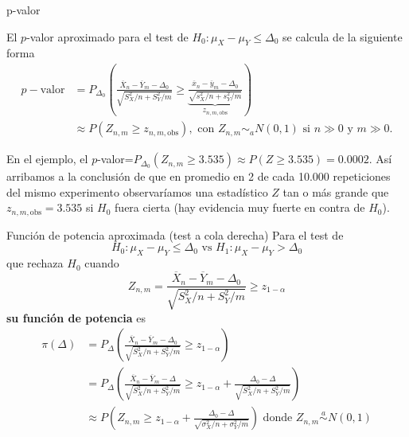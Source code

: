 \documentclass{beamer}
\theoremstyle{definition}
\begin{document}
\begin{frame}{\color{rosee} p-valor}
    
El $p$-valor aproximado para el test de $H_0: \mu_X-\mu_Y \leq \Delta_0$ se calcula de la siguiente forma
$$
\begin{aligned}
p-\text {valor} &=P_{\Delta_0}\left(\frac{\overline{X}_{n}-\overline{Y}_{m}-\Delta_0}{\sqrt{S_X^2 / n+S_Y^2 / m}} \geq \underbrace{\frac{\overline{x}_{n}-\overline{y}_{m}-\Delta_0}{\sqrt{s_X^2 / n+s_Y^2 / m}}}_{z_{n,m,\text{obs}}}\right) \\
&\approx P\left(Z_{n,m} \geq z_{n,m,\text{obs}}\right), \text{ con } Z_{n,m}\sim_a N(0,1) \text{ si } n\gg0 \text{ y } m\gg0.
\end{aligned}
$$

En el ejemplo, el $p$-valor=$P_{\Delta_0}(Z_{n,m}\geq 3.535)\approx P(Z\geq 3.535)=0.0002$.
 As\'i arribamos a la conclusi\'on de que en promedio en 2 de cada 10.000 repeticiones del mismo experimento observar\'iamos una estad\'istico $Z$ tan o m\'as grande que $z_{n,m,\text{obs}} = 3.535$ si $H_0$ fuera cierta (hay evidencia muy fuerte en contra de $H_0$).
\end{frame}




\begin{frame}{\color{rosee} Funci\'on de potencia aproximada (test a cola derecha)}
    \small
Para el test de
$$
H_0: \mu_X-\mu_Y \leq \Delta_0 \text { vs } H_1: \mu_X-\mu_Y>\Delta_0
$$
que rechaza $H_0$ cuando
$$
Z_{n,m}=\frac{\overline{X}_{n}-\overline{Y}_{m}-\Delta_0}{\sqrt{S_X^2 / n+S_Y^2 / m}} \geq z_{1-\alpha}
$$
\textbf{su funci\'on de potencia} es
$$
\begin{aligned}
\pi(\Delta) &=P_{\Delta}\left(\frac{\overline{X}_{n}-\overline{Y}_{m}-\Delta_0}{\sqrt{S_X^2 / n+S_Y^2 / m}} \geq z_{1-\alpha}\right) \\
&=P_{\Delta}\left(\frac{\overline{X}_{n}-\overline{Y}_{m}-\Delta}{\sqrt{S_X^2 / n+S_Y^2 / m}} \geq z_{1-\alpha}+\frac{\Delta_0-\Delta}{\sqrt{S_X^2 / n+S_Y^2 / m}}\right) \\
& \approx P\left(Z_{n,m} \geq z_{1- \alpha}+\frac{\Delta_0-\Delta}{\sqrt{\sigma_X^2 / n+\sigma_Y^2 / m}}\right) \text { donde } Z_{n,m}\stackrel{a}{\sim} N(0,1) 
\end{aligned}
$$
\end{frame}
\end{document}
